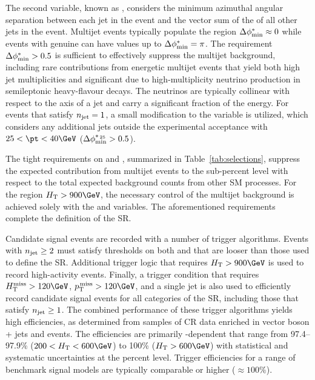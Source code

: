 The second variable, known as \bdphi, considers the minimum azimuthal
angular separation between each jet in the event and the vector sum of
the \pt of all other jets in the event. Multijet events typically
populate the region $\Delta\phi^{*}_\text{min} \approx 0$ while events with genuine
\ptvecmiss can have values up to $\Delta\phi^{*}_\text{min} = \pi$. The requirement
$\Delta\phi^{*}_\text{min} > 0.5$ is sufficient to effectively suppress the multijet
background, including rare contributions from energetic multijet
events that yield both high jet multiplicities and significant
\ptvecmiss due to high-multiplicity neutrino production in
semileptonic heavy-flavour decays. The neutrinos are typically
collinear with respect to the axis of a jet and carry a significant
fraction of the energy. For events that satisfy $n_{\text{jet}} = 1$, a small
modification to the \bdphi variable is utilized, which considers any
additional jets outside the experimental acceptance with $25 < \pt <
40\GeV$ ($\Delta\phi^{*_{\, 25}}_\text{min} > 0.5$).

The tight requirements on \alphat and \bdphi, summarized in
Table~\ref{tab:selections}, suppress the expected contribution from
multijet events to the sub-percent level with respect to the total
expected background counts from other SM processes. For the region
$\scalht > 900\GeV$, the necessary control of the multijet background
is achieved solely with the \bdphi and \bdphimod variables. The
aforementioned requirements complete the definition of the SR.

Candidate signal events are recorded with a number of trigger
algorithms. Events with $n_{\text{jet}} \geq 2$ must satisfy thresholds on both
\scalht and \alphat that are looser than those used to define the
SR. Additional trigger logic that requires $\scalht > 900\GeV$ is used
to record high-activity events. Finally, a trigger condition that
requires $\mht > 120\GeV$, $\ptmiss > 120\GeV$, and a single jet is
also used to efficiently record candidate signal events for all
categories of the SR, including those that satisfy $n_{\text{jet}} \geq 1$. The
combined performance of these trigger algorithms yields high
efficiencies, as determined from samples of CR data enriched in vector
boson + jets and \ttbar events. The efficiencies are primarily
\scalht-dependent that range from 97.4--97.9\% ($200 < \scalht <
600\GeV$) to 100\% ($\scalht > 600\GeV$) with statistical and
systematic uncertainties at the percent level. Trigger efficiencies
for a range of benchmark signal models are typically comparable or
higher (${\approx}100\%$).


